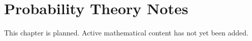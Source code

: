 
\section*{Probability Theory Notes}
This chapter is planned. Active mathematical content has not yet been added.

